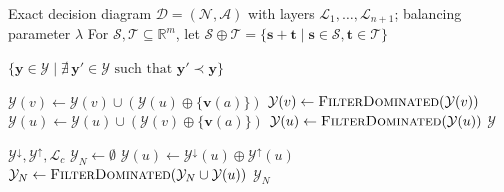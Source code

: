 \documentclass[letterpaper]{article}
\begin{document}
\begin{algorithm}[t!]
\caption{Bidirectional PF Enumeration}
\label{alg:bidir_pf}
\begin{algorithmic}[1]
\Require Exact decision diagram
$\mathcal{D}=(\mathcal{N},\mathcal{A})$
with layers $\mathcal{L}_1,\dots,\mathcal{L}_{n+1}$;
balancing parameter $\lambda$
\Statex For $\mathcal{S},\mathcal{T}\subseteq\mathbb{R}^m$, let
$\mathcal{S}\oplus\mathcal{T}
=\{\mathbf{s}+\mathbf{t}\mid
\mathbf{s}\in\mathcal{S},\mathbf{t}\in\mathcal{T}\}$

    \State \Return
    $\{
        \mathbf{y}\in\mathcal{Y}
        \mid
        \nexists\,\mathbf{y}'\in\mathcal{Y}
        \text{ such that }
        \mathbf{y}'\prec\mathbf{y}
    \}$
\EndProcedure

                \State
                $\mathcal{Y}(v)
                \gets
                \mathcal{Y}(v)
                \cup
                \left(
                    \mathcal{Y}(u)
                    \oplus
                    \{\mathbf{v}(a)\}
                \right)$
                \State
                $\mathcal{Y}(v)
                \gets
                \Call{FilterDominated}{\mathcal{Y}(v)}$
            \EndFor
        \EndFor
    \Else
                \State
                $\mathcal{Y}(u)
                \gets
                \mathcal{Y}(u)
                \cup
                \left(
                    \mathcal{Y}(v)
                    \oplus
                    \{\mathbf{v}(a)\}
                \right)$
                \State
                $\mathcal{Y}(u)
                \gets
                \Call{FilterDominated}{\mathcal{Y}(u)}$
            \EndFor
        \EndFor
    \EndIf
    \State \Return $\mathcal{Y}$
\EndProcedure

{$\mathcal{Y}^{\downarrow},
 \mathcal{Y}^{\uparrow},
 \mathcal{L}_c$}
    \State $\mathcal{Y}_N\gets\emptyset$
        \State
        $\mathcal{Y}(u)
        \gets
        \mathcal{Y}^{\downarrow}(u)
        \oplus
        \mathcal{Y}^{\uparrow}(u)$
        \State
        $\mathcal{Y}_N
        \gets
        \Call{FilterDominated}
        {\mathcal{Y}_N\cup\mathcal{Y}(u)}$
    \EndFor
    \State \Return $\mathcal{Y}_N$
\EndProcedure


\end{algorithmic}
\end{algorithm}
\end{document}
